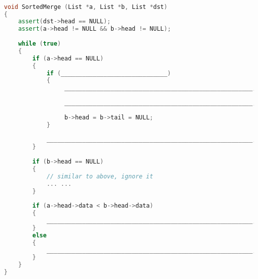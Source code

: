 \documentclass[10.5pt]{article}
\begin{document}
\hrulefill
\begin{lstlisting}[language=C++]

void SortedMerge (List *a, List *b, List *dst)
{
    assert(dst->head == NULL);
    assert(a->head != NULL && b->head != NULL);
        
    while (true)
    {      
        if (a->head == NULL)
        {
            if (______________________________)
            {
                 _____________________________________________________;
                 
                 _____________________________________________________;
                 
                 b->head = b->tail = NULL;
            }
            
            __________________________________________________________;
        }
        
        if (b->head == NULL)
        {
            // similar to above, ignore it
            ... ...
        }
     
        if (a->head->data < b->head->data)
        {
            __________________________________________________________;
        }   
        else
        {
            __________________________________________________________;
        }
    }
}

\end{lstlisting}
\pagebreak
\end{document}
